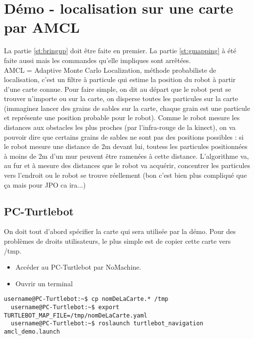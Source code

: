 \documentclass[11pt, a4paper,notitlepage]{article}
\begin{document}
\section{Démo - localisation sur une carte par AMCL}
 La partie \ref{st:bringup} doit être faite en premier. La partie \ref{st:gmapping} à été faite aussi mais les commandes qu'elle impliques sont arrêtées.\\
AMCL = Adaptive Monte Carlo Localization, méthode probabiliste de localisation, c'est un filtre à particule qui estime la position du robot à partir d'une carte connue. Pour faire simple, on dit au départ que le robot peut se trouver n'importe ou sur la carte, on disperse toutes les particules sur la carte (immaginez lancer des grains de sables sur la carte, chaque grain est une particule et représente une position probable pour le robot). Comme le robot mesure les distances aux obstacles les plus proches (par l'infra-rouge de la kinect), on va pouvoir dire que certains grains de sables ne sont pas des positions possibles : si le robot mesure une distance de 2m devant lui, toutess les particules positionnées à moins de 2m d'un mur peuvent être ramenées à cette distance. L'algorithme va, au fur et à mesure des distances que le robot va acquérir, concentrer les particules vers l'endroit ou le robot se trouve réellement (bon c'est bien plus compliqué que ça mais pour JPO ca ira...)

\subsection{PC-Turtlebot}
On doit tout d'abord spécifier la carte qui sera utilisée par la démo. Pour des problèmes de droits utilisateurs, le plus simple est de copier cette carte vers /tmp.
\begin{itemize}
  \item Accéder au PC-Turtlebot par NoMachine.
  \item Ouvrir un terminal
\end{itemize}
\begin{lstlisting}[style=Bash]
  username@PC-Turtlebot:~$ cp nomDeLaCarte.* /tmp
  username@PC-Turtlebot:~$ export TURTLEBOT_MAP_FILE=/tmp/nomDeLaCarte.yaml
  username@PC-Turtlebot:~$ roslaunch turtlebot_navigation amcl_demo.launch
\end{lstlisting}
\end{document}
